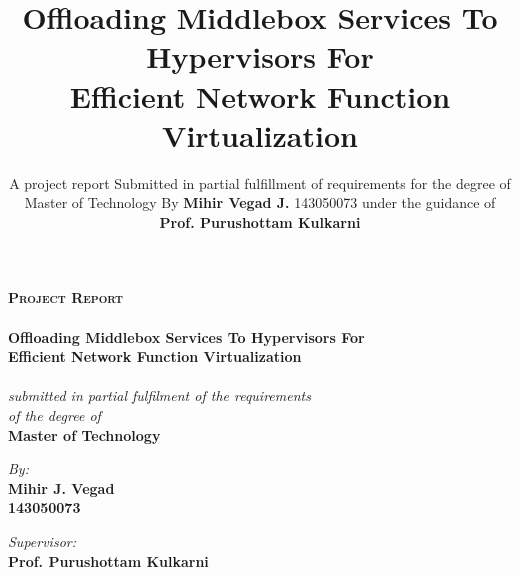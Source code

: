 \documentclass[a4paper,11pt]{report}
\title{\vspace{3pt} Offloading Middlebox Services To Hypervisors For\\[0.2cm] Efficient Network Function Virtualization}
\author{\vspace{2cm} A project report \vspace{3cm} Submitted in partial fulfillment of requirements for the degree of \vspace{2cm} Master of Technology \vspace{2cm} By \vspace{2cm} \textbf{Mihir Vegad J.} \vspace{1cm} 143050073 \vspace{2cm} under the guidance of \vspace{2cm} \textbf{Prof. Purushottam Kulkarni} \vspace{2cm}  
  }
\begin{document}




\begin{titlepage}
\begin{center}

\vspace*{2cm}

\textsc{\Large \bf Project Report}\\[0.85cm]

\hrulefill
\\[0.8cm]
{\LARGE \bf Offloading Middlebox Services To Hypervisors For\\[0.2cm] Efficient Network Function Virtualization}\\[0.8cm]
\hrulefill
\\[1cm]

\large \textit{submitted in partial fulfilment of the requirements\\
[0.5cm] of the degree of} \\
[0.5cm]\textbf{Master of Technology}\\[3cm] 

\begin{minipage}{0.44\textwidth}
\begin{flushleft} \large
\emph{By:}\\
{\Large \textbf {Mihir J. Vegad}} \\
\large \textbf {143050073}
\end{flushleft}
\end{minipage}
\begin{minipage}{0.44\textwidth}
\begin{flushright} \large
\emph{Supervisor:} \\
{\Large \textbf {Prof. Purushottam Kulkarni}}
\end{flushright}
\end{minipage}\\[2cm]




\end{center}
\end{titlepage}
\end{document}
